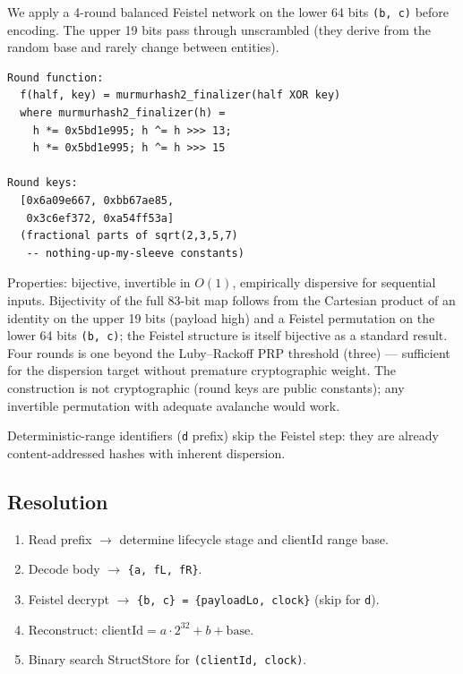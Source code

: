 We apply a 4-round balanced Feistel network on the lower 64 bits \texttt{(b, c)} before encoding. The upper 19 bits pass through unscrambled (they derive from the random base and rarely change between entities).

\begin{lstlisting}
Round function:
  f(half, key) = murmurhash2_finalizer(half XOR key)
  where murmurhash2_finalizer(h) =
    h *= 0x5bd1e995; h ^= h >>> 13;
    h *= 0x5bd1e995; h ^= h >>> 15

Round keys:
  [0x6a09e667, 0xbb67ae85,
   0x3c6ef372, 0xa54ff53a]
  (fractional parts of sqrt(2,3,5,7)
   -- nothing-up-my-sleeve constants)
\end{lstlisting}

Properties: bijective, invertible in $O(1)$, empirically dispersive for sequential inputs. Bijectivity of the full 83-bit map follows from the Cartesian product of an identity on the upper 19 bits (payload high) and a Feistel permutation on the lower 64 bits \texttt{(b, c)}; the Feistel structure is itself bijective as a standard result\cite{luby1988feistel}. Four rounds is one beyond the Luby--Rackoff PRP threshold (three) --- sufficient for the dispersion target without premature cryptographic weight. The construction is not cryptographic (round keys are public constants); any invertible permutation with adequate avalanche would work.

Deterministic-range identifiers (\texttt{d} prefix) skip the Feistel step: they are already content-addressed hashes with inherent dispersion.

\subsection{Resolution}

\begin{enumerate}
    \item Read prefix $\rightarrow$ determine lifecycle stage and clientId range base.
    \item Decode body $\rightarrow$ \texttt{\{a, fL, fR\}}.
    \item Feistel decrypt $\rightarrow$ \texttt{\{b, c\} = \{payloadLo, clock\}} (skip for \texttt{d}).
    \item Reconstruct: $\mathrm{clientId} = a \cdot 2^{32} + b + \mathrm{base}$.
    \item Binary search StructStore for \texttt{(clientId, clock)}.
\end{enumerate}

